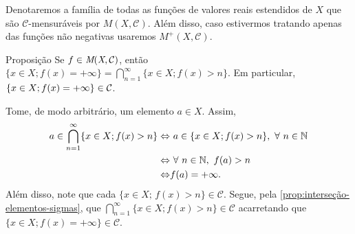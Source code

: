 	Denotaremos a família de todas as funções de valores reais estendidos de $X$ que são $\mathcal{C}$-mensuráveis por $M(X, \mathcal{C})$.
	Além disso, caso estivermos tratando apenas das funções não negativas usaremos $M^+(X, \mathcal{C})$.
    \begin{env}{Proposição}
    \label{prop:identidade-intersecao-mais-infinito}
        Se $f \in \operatorname{\textit{M}(\textit{X}, \mathcal{C} )}$, então $\{x \in X; f(x) = +\infty\} = \displaystyle \bigcap_{n = 1}^\infty \{x \in X; f(x) > n\}$.
        Em particular, $\{x \in X; f(x) = +\infty\} \in \operatorname{\mathcal{C}}$.
    \end{env}
    \begin{prova}
        Tome, de modo arbitrário, um elemento $a \in X$. 
        Assim, 
        \begin{align*}
            a \in \bigcap_{n = 1}^\infty \{x \in X; f(x) > n\} 
            \Leftrightarrow &\ a \in \{x \in X; f(x) > n\}, \ \forall\  n \in \N\\
            \Leftrightarrow &\  \forall\ n \in \N,\ f(a) > n\\
            \Leftrightarrow & f(a) = +\infty.  
        \end{align*}
    Além disso, note que cada $\{x \in X;\, f(x) > n\} \in \mathcal{C}$.
    Segue, pela \ref{prop:interseção-elementos-sigmas}, que \linebreak $\displaystyle \bigcap_{n = 1}^\infty \{x \in X; f(x) > n\} \in \mathcal{C}$ acarretando que $\{x \in X; f(x) = +\infty\} \in \mathcal{C}$. 
    \end{prova}

